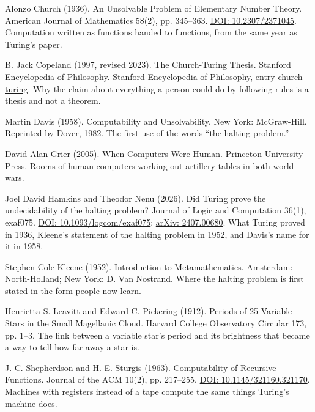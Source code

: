 \documentclass[11pt,twoside]{article}
\theoremstyle{thielethm}
\theoremstyle{thieledef}
\theoremstyle{thieledef}
\theoremstyle{thieledef}
\theoremstyle{thielethm}
\theoremstyle{thieleobs}
\theoremstyle{thielethm}
\begin{document}
\noindent Alonzo Church (1936). An Unsolvable Problem of Elementary Number Theory. American Journal of Mathematics 58(2), pp. 345--363. \href{https://doi.org/10.2307/2371045}{DOI: 10.2307/2371045}. Computation written as functions handed to functions, from the same year as Turing's paper.
\par\medskip

\noindent B. Jack Copeland (1997, revised 2023). The Church-Turing Thesis. Stanford Encyclopedia of Philosophy. \href{https://plato.stanford.edu/entries/church-turing/}{Stanford Encyclopedia of Philosophy, entry church-turing}. Why the claim about everything a person could do by following rules is a thesis and not a theorem.
\par\medskip

\noindent Martin Davis (1958). Computability and Unsolvability. New York: McGraw-Hill. Reprinted by Dover, 1982. The first use of the words ``the halting problem.''
\par\medskip

\noindent David Alan Grier (2005). When Computers Were Human. Princeton University Press. Rooms of human computers working out artillery tables in both world wars.
\par\medskip

\noindent Joel David Hamkins and Theodor Nenu (2026). Did Turing prove the undecidability of the halting problem? Journal of Logic and Computation 36(1), exaf075. \href{https://doi.org/10.1093/logcom/exaf075}{DOI: 10.1093/logcom/exaf075}; \href{https://arxiv.org/abs/2407.00680}{arXiv: 2407.00680}. What Turing proved in 1936, Kleene's statement of the halting problem in 1952, and Davis's name for it in 1958.
\par\medskip

\noindent Stephen Cole Kleene (1952). Introduction to Metamathematics. Amsterdam: North-Holland; New York: D. Van Nostrand. Where the halting problem is first stated in the form people now learn.
\par\medskip

\noindent Henrietta S. Leavitt and Edward C. Pickering (1912). Periods of 25 Variable Stars in the Small Magellanic Cloud. Harvard College Observatory Circular 173, pp. 1--3. The link between a variable star's period and its brightness that became a way to tell how far away a star is.
\par\medskip

\noindent J. C. Shepherdson and H. E. Sturgis (1963). Computability of Recursive Functions. Journal of the ACM 10(2), pp. 217--255. \href{https://doi.org/10.1145/321160.321170}{DOI: 10.1145/321160.321170}. Machines with registers instead of a tape compute the same things Turing's machine does.
\par\medskip
\end{document}
